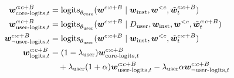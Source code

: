 \begin{align*}
    \boldsymbol{w}_{\text{core-logits}, t}^{c:c+B} &= \operatorname{logits}_{\theta_{\text{core}}}(\boldsymbol{w}^{c:c+B} \mid \boldsymbol{w}_{\text{inst}}, \boldsymbol{w}^{<c}, \Tilde{\boldsymbol{w}}_t^{c:c+B}) \\
    \boldsymbol{w}_{\text{user-logits}, t}^{c:c+B} &= \operatorname{logits}_{\theta_{\text{user}}}(\boldsymbol{w}^{c:c+B} \mid D_{\text{user}}, \boldsymbol{w}_{\text{inst}}, \boldsymbol{w}^{<c}, \Tilde{\boldsymbol{w}}_t^{c:c+B}) \\
    \boldsymbol{w}_{\neg \text{user-logits}, t}^{c:c+B} &= \operatorname{logits}_{\theta_{\text{user}}}(\boldsymbol{w}^{c:c+B} \mid \boldsymbol{w}_{\text{inst}}, \boldsymbol{w}^{<c}, \Tilde{\boldsymbol{w}}_t^{c:c+B}) \\
    \boldsymbol{w}_{\text{logits}, t}^{c:c+B} &= (1-\lambda_{\text{user}}) \boldsymbol{w}_{\text{core-logits}, t}^{c:c+B} \\
    &\quad + \lambda_{\text{user}} (1+\alpha) \boldsymbol{w}_{\text{user-logits}, t}^{c:c+B} - \lambda_{\text{user}} \alpha \boldsymbol{w}_{\neg \text{user-logits}, t}^{c:c+B}
\end{align*}
